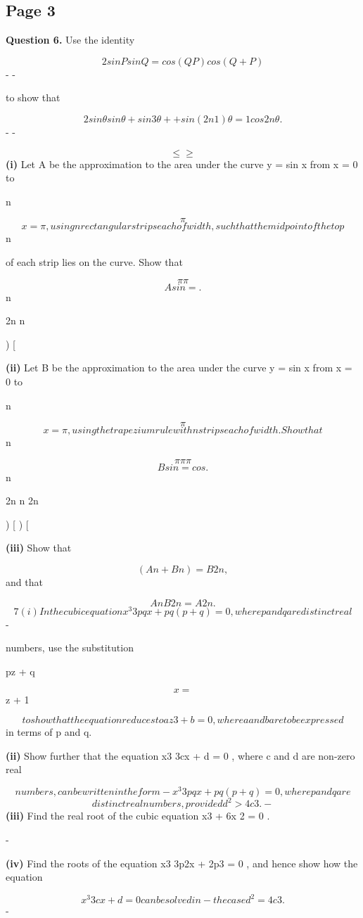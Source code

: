 \documentclass[12pt]{article}
\begin{document}
\subsection*{Page 3}
\begin{flushleft}
\bigskip\textbf{Question 6.} Use the identity\par
\[2 sin P sin Q = cos(Q P ) cos(Q + P )\]
- -\par
to show that\par
\[2 sin θ sin θ + sin 3θ + + sin(2n 1)θ = 1 cos 2nθ .\]
\cdots - -\par
\[\leq \geq\]
\textbf{(i)} Let A be the approximation to the area under the curve y = sin x from x = 0 to\par
n\par
\[\pi\]
\[x = \pi, using n rectangular strips each of width , such that the midpoint of the top\]
n\par
of each strip lies on the curve. Show that\par
\[\pi \pi\]
\[A sin = .\]
n\par
2n n\par
) [\par
\textbf{(ii)} Let B be the approximation to the area under the curve y = sin x from x = 0 to\par
n\par
\[\pi\]
\[x = \pi , using the trapezium rule with n strips each of width . Show that\]
n\par
\[\pi \pi \pi\]
\[B sin = cos .\]
n\par
2n n 2n\par
) [ ) [\par
\textbf{(iii)} Show that\par
\[(A n + B n ) = B 2n ,\]
and that\par
\[A n B 2n = A 2n .\]
\[7 (i) In the cubic equation x^3 3pqx + pq(p + q) = 0 , where p and q are distinct real\]
-\par
numbers, use the substitution\par
pz + q\par
\[x =\]
z + 1\par
\[to show that the equation reduces to az3 + b = 0 , where a and b are to be expressed\]
in terms of p and q.\par
\textbf{(ii)} Show further that the equation x3 3cx + d = 0 , where c and d are non-zero real\par
\[numbers, can be written in the form - x^3 3pqx + pq(p + q) = 0 , where p and q are\]
\[distinct real numbers, provided d^2 > 4c3 . -\]
\textbf{(iii)} Find the real root of the cubic equation x3 + 6x 2 = 0 .\par
-\par
\textbf{(iv)} Find the roots of the equation x3 3p2x + 2p3 = 0 , and hence show how the equation\par
\[x^3 3cx + d = 0 can be solved in - the case d^2 = 4c3 .\]
-\par
\end{flushleft}
\end{document}
